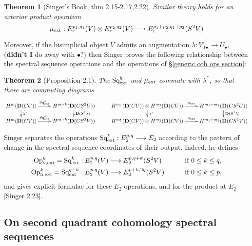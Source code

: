 \documentclass[11pt]{amsart}
\theoremstyle{plain}
\newtheorem{thm}{Theorem}[section]
\theoremstyle{definition}
\renewcommand{\to}{\longrightarrow}
\theoremstyle{plain}
\newcommand{\ExtCohOp}{\textup{Sq}_\textup{ext}}
\newcommand{\vExtCohOp}{\textup{Op}_\textup{v,ext}}
\newcommand{\hExtCohOp}{\textup{Op}_\textup{h,ext}}
\newcommand{\ExtCohProd}{\mu_\textup{ext}}
\newcommand{\Sq}{\mathrm{Sq}}
\newcommand{\dual}{\mathbf{D}}
\begin{document}
\begin{External spectral sequence operations}
\begin{thm}[Singer's Book, thm 2.15-2.17,2.22]
Similar theory holds for an exterior product operation
\[\ExtCohProd:E_r^{p_1,q_1}(V)\otimes E_r^{p_2,q_2}(V)\to E_r^{p_1+p_2,q_1+p_2}(S^2V)\]
\end{thm}
Moreover, if the bisimplicial object $V$ admits an augmentation $\lambda:V_{0\bullet}\to U_{\bullet}$, (\textbf{didn't I} do away with $\bullet$?) then %
Singer proves the following relationship between the spectral sequence operations and the operations of \S\ref{generic coh ops section}:
\begin{thm}[Proposition 2.1]
The $\ExtCohOp^k$ and $\ExtCohProd$ commute with $\lambda^*$, so that there are commuting diagrams
\[\xymatrix@R=4mm{
H^{m}(\dual(CU))\ar[r]^-{\ExtCohOp^k}
\ar[d]^-{\lambda^*}
&%
H^{m+k}(\dual(CS^2U))\ar[d]^-{\dual(S^2\lambda)}
&%
H^{m_1}(\dual(CU))\otimes H^{m_2}(\dual(CU))\ar[r]^-{\ExtCohProd}
\ar[d]^-{\lambda^*}
&%
H^{m_1+m_2}(\dual(CS^2U))\ar[d]^-{\dual(S^2\lambda)}
\\%
H^{m}(\dual(CV))\ar[r]^-{\ExtCohOp^k}
&%
H^{m+k}(\dual(CS^2V))
&%
H^{m_1}(\dual(CV))\otimes H^{m_2}(\dual(CV))\ar[r]^-{\ExtCohProd}
&%
H^{m_1+m_2}(\dual(CS^2V))
}\]
\end{thm}

Singer separates the operations $\ExtCohOp^k:E^{p,q}_2\to E_{2}$ according to the pattern of change in the spectral sequence coordinates of their output. Indeed, he defines
\begin{alignat*}{2}
\vExtCohOp^k=\ExtCohOp^k:E^{p,q}_2(V)&\to E^{p,q+k}_2(S^2V)&\qquad&\text{if }0\leq k \leq q,\\
\hExtCohOp^k=\ExtCohOp^{q+k}:E^{p,q}_2(V)&\to E^{p+k,2q}_2(S^2V)&\qquad&\text{if }0\leq k \leq p,
\end{alignat*}
and gives explicit formulae for these $E_2$ operations, and for the product at $E_2$ [Singer 2.23].

\subsection{On second quadrant cohomology spectral sequences}


\end{External spectral sequence operations}
\end{document}
